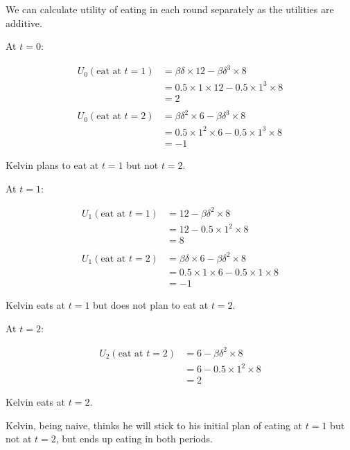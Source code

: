 \documentclass[
  letterpaper,
  DIV=11,
  numbers=noendperiod]{scrreprt}
\begin{document}
\begin{tcolorbox}[enhanced jigsaw, title=\textcolor{quarto-callout-tip-color}{\faLightbulb}\hspace{0.5em}{Answer}, toprule=.15mm, colback=white, breakable, titlerule=0mm, colframe=quarto-callout-tip-color-frame, coltitle=black, opacityback=0, rightrule=.15mm, colbacktitle=quarto-callout-tip-color!10!white, bottomtitle=1mm, opacitybacktitle=0.6, arc=.35mm, bottomrule=.15mm, toptitle=1mm, leftrule=.75mm, left=2mm]

We can calculate utility of eating in each round separately as the
utilities are additive.

At \(t=0\):

\begin{align*}
U_0(\text{eat at }t=1)&=\beta\delta\times 12-\beta\delta^3\times 8 \\
&=0.5\times 1\times 12-0.5\times 1^3 \times 8 \\
&=2 \\
\\
U_0(\text{eat at } t=2)&=\beta\delta^2\times 6-\beta\delta^3\times 8 \\
&=0.5\times 1^2\times 6-0.5\times 1^3 \times 8 \\
&=-1 
\end{align*}

Kelvin plans to eat at \(t=1\) but not \(t=2\).

At \(t=1\):

\begin{align*}
U_1(\text{eat at } t=1)&=12-\beta\delta^2\times 8 \\
&=12-0.5\times 1^2 \times 8 \\
&=8 \\
\\
U_1(\text{eat at } t=2)&=\beta\delta\times 6-\beta\delta^2\times 8 \\
&=0.5\times 1\times 6-0.5\times 1 \times 8 \\
&=-1 
\end{align*}

Kelvin eats at \(t=1\) but does not plan to eat at \(t=2\).

At \(t=2\):

\begin{align*}
U_2(\text{eat at } t=2)&=6-\beta\delta^2\times 8 \\
&=6-0.5\times 1^2 \times 8 \\
&=2 
\end{align*}

Kelvin eats at \(t=2\).

Kelvin, being naive, thinks he will stick to his initial plan of eating
at \(t=1\) but not at \(t=2\), but ends up eating in both periods.

\end{tcolorbox}
\end{document}
